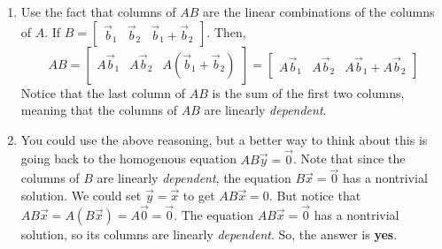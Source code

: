 \begin{enumerate}
\begin{enumerate}
	\item We could use the fact that left-multiplying a matrix by another (appropriate) matrix (say \(AB\)) is similar to taking a linear combination of the
		\emph{rows} of the right matrix (\(B\) in this case) with the entries of the \(i\)-th \emph{row} of \(A\) acting as weights. In this case, the second row of	
		\(AB\) is \(\row_2(A) \cdot B\), or 
		\[\begin{bmatrix}1 & 5 & 6\end{bmatrix}\begin{bmatrix}2 & 0 & -1 \\ 3 & 1 & 1 \\ 0 & 3 & 0\end{bmatrix} 
		   = 1\begin{bmatrix}2 & 0 & -1\end{bmatrix} + 5\begin{bmatrix}3 & 1 & 1\end{bmatrix} + 6\begin{bmatrix}0 & 3 & 0\end{bmatrix}
		   = \begin{bmatrix}17 & 23 & 4\end{bmatrix}\]
	\end{enumerate} 	
	\item Use the fact that columns of \(AB\) are the linear combinations of the columns of \(A\). If 
		\(B = \begin{bmatrix}\vec{b}_1 & \vec{b}_2 & \vec{b}_1 + \vec{b}_2\end{bmatrix}\). Then, 
		\[AB = \begin{bmatrix}A\vec{b}_1 & A\vec{b}_2 & A(\vec{b}_1 + \vec{b}_2)\end{bmatrix} 
		       = \begin{bmatrix}A\vec{b}_1 & A\vec{b}_2 & A\vec{b}_1 + A\vec{b}_2\end{bmatrix}\]
		Notice that the last column of \(AB\) is the sum of the first two columns, meaning that the columns of \(AB\) are linearly \emph{dependent}.
	\item You could use the above reasoning, but a better way to think about this is going back to the homogenous equation \(AB\vec{y} = \vec{0}\). Note that 
		since the columns of \(B\) are linearly \emph{dependent}, the equation \(B\vec{x} = \vec{0}\) has a nontrivial solution. We could set 
		\(\vec{y} = \vec{x}\) to get \(AB\vec{x} = 0\). But notice that \(AB\vec{x} = A(B\vec{x}) = A\vec{0} = \vec{0}.\) The equation \(AB\vec{x} = \vec{0}\)
		has a nontrivial solution, so its columns are linearly \emph{dependent}. So, the answer is \textbf{yes}.
\end{enumerate}

